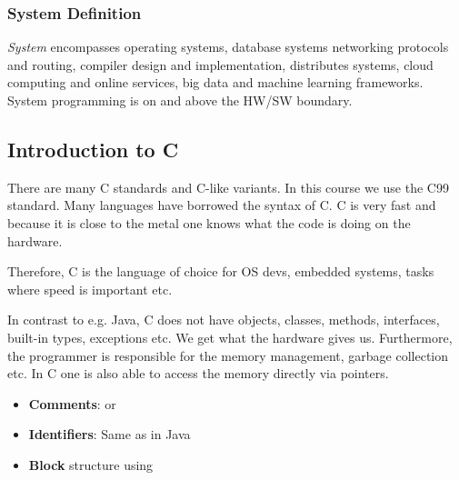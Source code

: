 

\subsubsection{System Definition}
\textit{System} encompasses operating systems, database systems networking protocols and routing, compiler design and implementation, distributes systems, cloud computing and online services, big data and machine learning frameworks. System programming is on and above the HW/SW boundary.

\subsection*{Introduction to C}
There are many C standards and C-like variants. In this course we use the C99 standard. Many languages have borrowed the syntax of C. C is very fast and because it is close to the metal one knows what the code is doing on the hardware.

Therefore, C is the language of choice for OS devs, embedded systems, tasks where speed is important etc.

In contrast to e.g. Java, C does not have objects, classes, methods, interfaces, built-in types, exceptions etc. We get what the hardware gives us. Furthermore, the programmer is responsible for the memory management, garbage collection etc. In C one is also able to access the memory directly via pointers.

\begin{itemize}
    \item \textbf{Comments}:  or \code{//}
    \item \textbf{Identifiers}: Same as in Java
    \item \textbf{Block} structure using 
\end{itemize}

